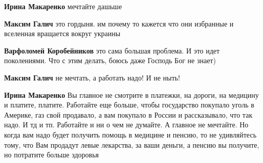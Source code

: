 \begin{itemize}
\begin{itemize}
 
\textbf{Ирина Макаренко} мечтайте дашьше

 
\textbf{Максим Галич} это гордыня. им почему то кажется что они избранные и вселенная вращается вокруг украины

 
\textbf{Варфоломей Коробейников} это сама большая проблема. И это идет поколениями. Что с этим делать, боюсь даже Господь Бог не знает)

 
\textbf{Максим Галич} не мечтать, а работать надо! И не ныть!

 
\textbf{Ирина Макаренко} Вы главное не смотрите в платежки, на дороги, на
медицину и платите, платите. Работайте еще больше, чтобы государство покупало
уголь в Америке, газ свой продавало, а вам покупало в России и рассказывало,
что так надо. И тд и тп. Работайте и ни о чем не думайте. А главное не
мечтайте. Но когда вам надо будет получить помощь в медицине и пенсию, то не
удивляйтесь тому, что Вам продадут левые лекарства, за ваши деньги, а пенсию вы
получите, но потратите больше здоровья

\end{itemize}

\end{itemize}

